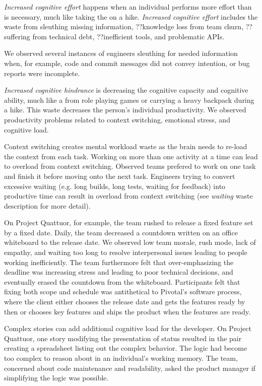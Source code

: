 \textit{Increased cognitive effort} happens when an individual performs more effort than is necessary, much like taking the  on a hike. \textit{Increased cognitive effort} includes the waste from sleuthing missing information, ??knowledge loss from team churn, ??suffering from technical debt, ??inefficient tools, and problematic APIs.

We observed several instances of engineers sleuthing for needed information when, for example, code and commit messages did not convey intention, or bug reports were incomplete. 
 

\textit{Increased cognitive hindrance} is decreasing the cognitive capacity and cognitive ability, much like a  from role playing games or carrying a heavy backpack during a hike. This waste decreases the person's individual productivity. We observed productivity problems related to context switching, emotional stress, and cognitive load.

Context switching creates mental workload waste as the brain needs to re-load the context from each task. Working on more than one activity at a time can lead to overload from context switching. Observed teams prefered to work on one task and finish it before moving onto the next task. Engineers trying to convert excessive waiting (e.g. long builds, long tests, waiting for feedback) into productive time can result in overload from context switching (see \textit{waiting} waste description for more detail).

On Project Quattuor, for example, the team rushed to release a fixed feature set by a fixed date. Daily, the team decreased a countdown written on an office whiteboard to the release date. We observed low team morale, rush mode, lack of empathy, and waiting too long to resolve interpersonal issues leading to people working inefficiently. The team furthermore felt that over-emphasizing the deadline was increasing stress and leading to poor technical decisions, and eventually erased the countdown from the whiteboard. Participants felt that fixing both scope and schedule was antithetical to Pivotal's software process, where the client either chooses the release date and gets the features ready by then or chooses key features and ships the product when the features are ready. 

Complex stories can add additional cognitive load for the developer. On Project Quattuor, one story modifying the presentation of status resulted in the pair creating a spreadsheet listing out the complex behavior. The logic had become too complex to reason about in an individual's working memory. The team, concerned about code maintenance and readability, asked the product manager if simplifying the logic was possible. 

